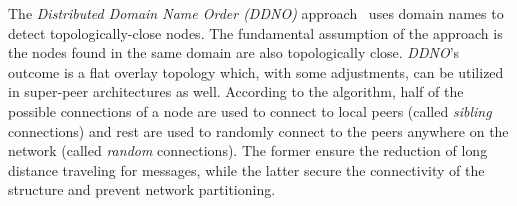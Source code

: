 
%
%
%

The \emph{Distributed Domain Name Order (DDNO)} approach~\cite{Z-YK2005} 
uses domain names to detect topologically-close nodes.
The fundamental assumption of the approach is the nodes found in 
the same domain are also topologically close.
\emph{DDNO}'s outcome is a flat overlay topology which, with some adjustments, 
can be utilized in super-peer architectures as well. According to the algorithm,
half of the possible connections of a node are used to connect to local peers
(called \emph{sibling} connections) and rest are used to randomly
connect to the peers anywhere on the network (called \emph{random} connections).
The former ensure the reduction of long distance traveling for messages, while
the latter secure the connectivity of the structure and prevent network
partitioning.

